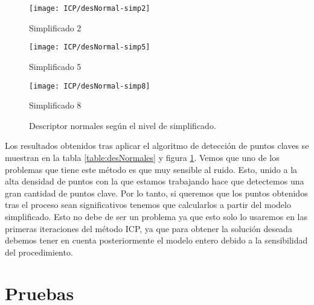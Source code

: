 \begin{figure}[h!]
	\begin{minipage}[b]{0.5\textwidth}
		\centering
		\texttt{[image: ICP/desNormal-simp2]}
		\caption*{Simplificado 2}
	\end{minipage}
	\begin{minipage}[b]{0.5\textwidth}
		\centering
		\texttt{[image: ICP/desNormal-simp5]}
		\caption*{Simplificado 5}
	\end{minipage}
	\begin{center}
		\begin{minipage}[b]{0.5\textwidth}
		\centering
		\texttt{[image: ICP/desNormal-simp8]}
		\caption*{Simplificado 8}
	\end{minipage}
	\end{center}
	\caption{Descriptor normales según el nivel de simplificado.}
	\label{Ej_simpli_real}
\end{figure}
Los resultados obtenidos tras aplicar el algoritmo de detección de puntos claves se muestran en la tabla \ref{table:desNormales} y figura \ref{Ej_simpli_real}. Vemos que uno de los problemas que tiene este método es que muy sensible al ruido. Esto, unido a la alta densidad de puntos con la que estamos trabajando hace que detectemos una gran cantidad de puntos clave. Por lo tanto, si queremos que los puntos obtenidos tras el proceso sean significativos tenemos que calcularlos a partir del modelo simplificado. Esto no debe de ser un problema ya que esto solo lo usaremos en las primeras iteraciones del método ICP, ya que para obtener la solución deseada debemos tener en cuenta posteriormente el modelo entero debido a la sensibilidad del procedimiento. 

\section{Pruebas}
